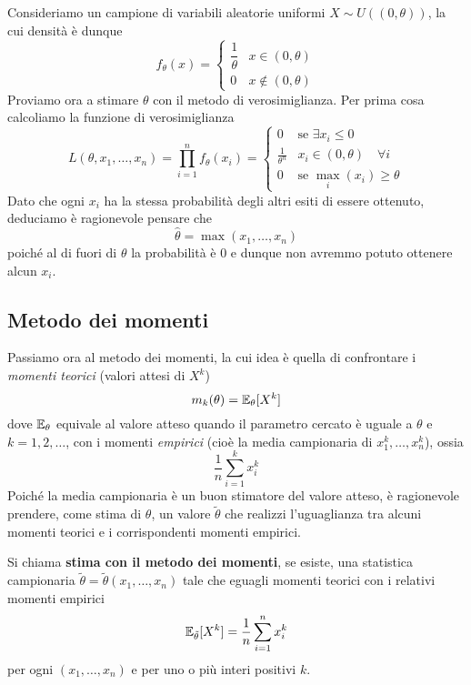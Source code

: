 \begin{example}
	Consideriamo un campione di variabili aleatorie uniformi $X \sim U((0, \theta))$, la cui
	densità è dunque
	\[
		f_\theta (x) = \begin{cases}
			\dfrac{1}{\theta} & x \in (0, \theta)    \\[2ex]
			0                 & x \notin (0, \theta)
		\end{cases}
	\]
	Proviamo ora a stimare $\theta$ con il metodo di verosimiglianza. Per prima cosa calcoliamo la
	funzione di verosimiglianza
	\[
		L(\theta, x_1, \dots, x_n) = \prod_{i=1}^n f_\theta(x_i) = \begin{cases}
			0                  & \text{se } \exists x_i \leq 0       \\
			\frac{1}{\theta^n} & x_i \in (0, \theta) \quad \forall i \\
			0                  & \text{se } \max_i (x_i) \geq \theta
		\end{cases}
	\]
	Dato che ogni $x_i$ ha la stessa probabilità degli altri esiti di essere ottenuto, deduciamo è
	ragionevole pensare che
	\[ \hat{\theta} = \max(x_1, \dots, x_n) \]
	poiché al di fuori di $\theta$ la probabilità è 0 e dunque non avremmo potuto ottenere alcun
	$x_i$.
\end{example}

\subsection{Metodo dei momenti}
Passiamo ora al metodo dei momenti, la cui idea è quella di confrontare i \emph{momenti teorici}
(valori attesi di $X^k$)
\[ m_k(\theta) = \mathbb{E}_\theta [X^k] \]
dove $\mathbb{E}_\theta$ equivale al valore atteso quando il parametro cercato è uguale a $\theta$ e
$k = 1,2,\dots$, con i momenti \emph{empirici} (cioè la media campionaria di $x_1^k, \dots, x_n^k$),
ossia
\[ \frac{1}{n} \sum_{i=1}^k x_i^k \]
Poiché la media campionaria è un buon stimatore del valore atteso, è ragionevole prendere, come
stima di $\theta$, un valore $\tilde{\theta}$ che realizzi l'uguaglianza tra alcuni momenti teorici
e i corrispondenti momenti empirici.

\begin{definition}
	Si chiama \textbf{stima con il metodo dei momenti}, se esiste, una statistica campionaria
	$\tilde{\theta} = \tilde{\theta}(x_1, \dots, x_n)$ tale che eguagli momenti teorici con i
	relativi momenti empirici
	\[ \mathbb{E}_{\tilde{\theta}} [X^k] = \frac{1}{n} \sum_{i=1}^{n} x_i^k \]
	per ogni $(x_1, \dots, x_n)$ e per uno o più interi positivi $k$.
\end{definition}

